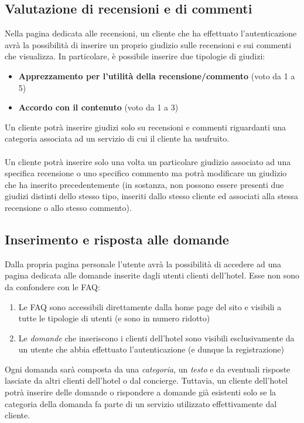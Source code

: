 \documentclass [a4paper, 12pt]{book}
\begin{document}
\subsection{Valutazione di recensioni e di commenti}
Nella pagina dedicata alle recensioni, un cliente che ha effettuato l'autenticazione avrà la possibilità di inserire un proprio giudizio sulle recensioni e sui commenti che visualizza. In particolare, è possibile inserire due tipologie di giudizi:
\begin{itemize}
\item \textbf{Apprezzamento per l'utilità della recensione/commento} (voto da 1 a 5)
\item \textbf{Accordo con il contenuto} (voto da 1 a 3)
\end{itemize}
Un cliente potrà inserire giudizi solo su recensioni e commenti riguardanti una categoria associata ad un servizio di cui il cliente ha usufruito.\\\\
Un cliente potrà inserire solo una volta un particolare giudizio associato ad una specifica recensione o uno specifico commento ma potrà modificare un giudizio che ha inserito precedentemente (in sostanza, non possono essere presenti due giudizi distinti dello stesso tipo, inseriti dallo stesso cliente ed associati alla stessa recensione o allo stesso commento).

\medskip

\subsection{Inserimento e risposta alle domande}
Dalla propria pagina personale l'utente avrà la possibilità di accedere ad una pagina dedicata alle domande inserite dagli utenti clienti dell'hotel. Esse non sono da confondere con le FAQ:
\begin{enumerate}
\item Le FAQ sono accessibili direttamente dalla home page del sito e visibili a tutte le tipologie di utenti (e sono in numero ridotto)
\item Le \textit{domande} che inseriscono i clienti dell'hotel sono visibili esclusivamente da un utente che abbia effettuato l'autenticazione (e dunque la registrazione)
\end{enumerate}
Ogni domanda sarà composta da una \textit{categoria}, un \textit{testo} e da eventuali risposte lasciate da altri clienti dell'hotel o dal concierge. Tuttavia, un cliente dell'hotel potrà inserire delle domande o rispondere a domande già esistenti solo  se la categoria della domanda fa parte di un servizio utilizzato effettivamente dal cliente.
\end{document}
